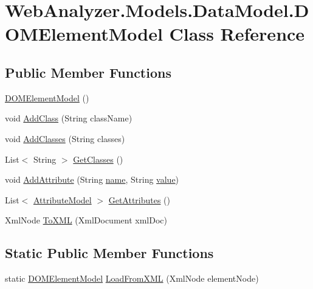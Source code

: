 \hypertarget{class_web_analyzer_1_1_models_1_1_data_model_1_1_d_o_m_element_model}{}\section{Web\+Analyzer.\+Models.\+Data\+Model.\+D\+O\+M\+Element\+Model Class Reference}
\label{class_web_analyzer_1_1_models_1_1_data_model_1_1_d_o_m_element_model}
\subsection*{Public Member Functions}
\begin{DoxyCompactItemize}
\item 
\hyperlink{class_web_analyzer_1_1_models_1_1_data_model_1_1_d_o_m_element_model_ab48617b264142c24cea4d7bb461961e6}{D\+O\+M\+Element\+Model} ()
\item 
void \hyperlink{class_web_analyzer_1_1_models_1_1_data_model_1_1_d_o_m_element_model_ae0a8230577329fb64c25b3a9b22a0967}{Add\+Class} (String class\+Name)
\item 
void \hyperlink{class_web_analyzer_1_1_models_1_1_data_model_1_1_d_o_m_element_model_aad9bb498768e58e7baf0d38d8f9fddf8}{Add\+Classes} (String classes)
\item 
List$<$ String $>$ \hyperlink{class_web_analyzer_1_1_models_1_1_data_model_1_1_d_o_m_element_model_a21691fa37ebac85603f666e75b179c13}{Get\+Classes} ()
\item 
void \hyperlink{class_web_analyzer_1_1_models_1_1_data_model_1_1_d_o_m_element_model_a23a4fd979c26240cdc178518b372bbf9}{Add\+Attribute} (String \hyperlink{_u_i_2_h_t_m_l_resources_2js_2src_2create__experiment_8js_adac2bcb4f01b574cbc63fe8ee2c56bf0}{name}, String \hyperlink{_u_i_2_h_t_m_l_resources_2js_2lib_2underscore_8min_8js_af7e1471ab89699458c4df8bb657298f6}{value})
\item 
List$<$ \hyperlink{class_web_analyzer_1_1_models_1_1_data_model_1_1_attribute_model}{Attribute\+Model} $>$ \hyperlink{class_web_analyzer_1_1_models_1_1_data_model_1_1_d_o_m_element_model_a26b205e403ba3838d31995d413424403}{Get\+Attributes} ()
\item 
Xml\+Node \hyperlink{class_web_analyzer_1_1_models_1_1_data_model_1_1_d_o_m_element_model_a837f358bb57a34f2b0427b7b7adec954}{To\+X\+M\+L} (Xml\+Document xml\+Doc)
\end{DoxyCompactItemize}
\subsection*{Static Public Member Functions}
\begin{DoxyCompactItemize}
\item 
static \hyperlink{class_web_analyzer_1_1_models_1_1_data_model_1_1_d_o_m_element_model}{D\+O\+M\+Element\+Model} \hyperlink{class_web_analyzer_1_1_models_1_1_data_model_1_1_d_o_m_element_model_a03824b9e7af2471a63594d4776d461ff}{Load\+From\+X\+M\+L} (Xml\+Node element\+Node)
\end{DoxyCompactItemize}
